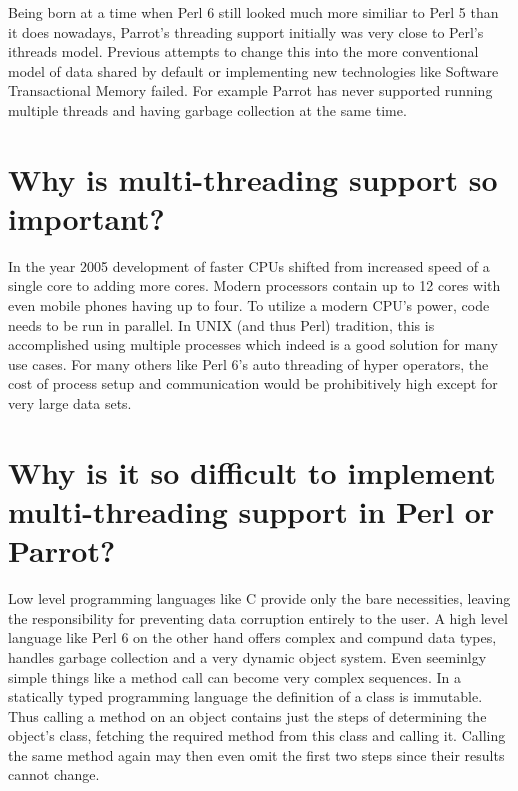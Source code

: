 \documentclass[bachelor,english]{hgbthesis}
\begin{document}
Being born at a time when Perl 6 still looked much more similiar to Perl 5 than it does nowadays, Parrot's threading support initially was very close to Perl's ithreads model. Previous attempts to change this into the more conventional model of data shared by default or implementing new technologies like Software Transactional Memory failed. For example Parrot has never supported running multiple threads and having garbage collection at the same time.

\section{Why is multi-threading support so important?}

In the year 2005 development of faster CPUs shifted from increased speed of a single core to adding more cores. Modern processors contain up to 12 cores with even mobile phones having up to four. To utilize a modern CPU's power, code needs to be run in parallel. In UNIX (and thus Perl) tradition, this is accomplished using multiple processes which indeed is a good solution for many use cases. For many others like Perl 6's auto threading of hyper operators, the cost of process setup and communication would be prohibitively high except for very large data sets.

\section{Why is it so difficult to implement multi-threading support in Perl or Parrot?}

Low level programming languages like C provide only the bare necessities, leaving the responsibility for preventing data corruption entirely to the user. A high level language like Perl 6 on the other hand offers complex and compund data types, handles garbage collection and a very dynamic object system. Even seeminlgy simple things like a method call can become very complex sequences. In a statically typed programming language the definition of a class is immutable. Thus calling a method on an object contains just the steps of determining the object's class, fetching the required method from this class and calling it. Calling the same method again may then even omit the first two steps since their results cannot change.
\end{document}

